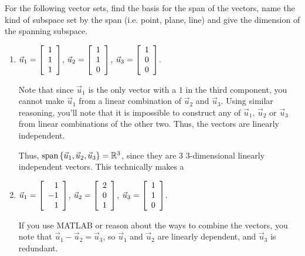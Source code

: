 \documentclass{ximera}
\begin{document}
\begin{example}

  For the following vector sets, find the basis for the span of the vectors, name the kind of subspace set by the span (i.e. point, plane, line) and give the dimension of the spanning subspace.

  \begin{enumerate}

    \item $\vect{u}_1=\startmat{r} 1 \\ 1 \\ 1 \stopmat$, $\vect{u}_2=\startmat{r} 1 \\ 1 \\ 0 \stopmat$, $\vect{u}_3=\startmat{r} 1 \\ 0 \\ 0 \stopmat$.
    
    \begin{solution}
    
      Note that since $\vec{u}_1$ is the only vector with a $1$ in the third component, you cannot make $\vec{u}_1$ from a linear combination of $\vec{u}_2$ and $\vec{u}_3$. Using similar reasoning, you'll note that it is impossible to construct any of $\vec{u}_1$, $\vec{u}_2$ or $\vec{u}_3$ from linear combinations of the other two. Thus, the vectors are linearly independent. 
      
      Thus, $\sspan\set{\vect{u}_1,\vect{u}_2,\vec{u}_3}=\R^3$, since they are 3 $3$-dimensional linearly independent vectors. This technically makes a 

    \end{solution}

    \item $\vect{u}_1=\startmat{r} 1 \\ -1 \\ 1 \stopmat$, $\vect{u}_2=\startmat{r} 2 \\ 0 \\ 1 \stopmat$, $\vect{u}_3=\startmat{r} 1 \\ 1 \\ 0 \stopmat$.
    
    \begin{solution}
    
      If you use MATLAB or reason about the ways to combine the vectors, you note that $\vec{u}_1-\vec{u}_2=\vec{u}_3$, so $\vec{u}_1$ and $\vec{u}_2$ are linearly dependent, and $\vec{u}_3$ is redundant.
      

\end{solution}
\end{enumerate}
\end{example}
\end{document}
